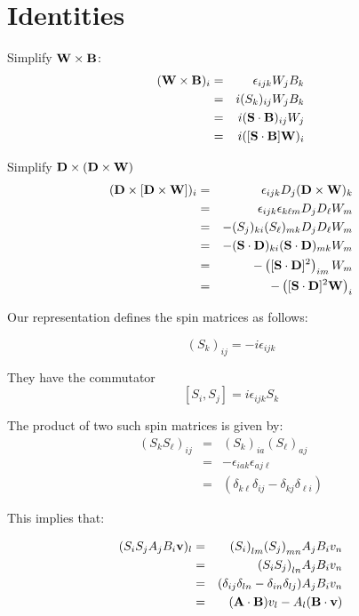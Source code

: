 \section{Identities}

Simplify $ \mathbf{W} \times \mathbf{B}$:
\begin{eqnarray*}
(\mathbf{W} \times \mathbf{B})_i
	&=&	\epsilon_{ijk} W_j B_k	\\
	&=&	i(S_k)_{ij} W_j B_k\\
	&=&	i(\mathbf{S} \cdot \mathbf{B})_{ij} W_j	\\
	&=&	i([\mathbf{S} \cdot \mathbf{B}] \mathbf{W})_i
\end{eqnarray*}

Simplify $\mathbf{D} \times ( \mathbf{D} \times \mathbf{W} ) $
\begin{eqnarray*}
(\mathbf{D} \times [ \mathbf{D} \times \mathbf{W} ] )_i
	&=&	\epsilon_{ijk} D_j (\mathbf{D} \times \mathbf{W})_k	\\
	&=&	\epsilon_{ijk} \epsilon_{k\ell m} D_j D_\ell W_m	\\
	&=&	-(S_j)_{ki} (S_\ell)_{mk} D_j D_\ell W_m	\\
	&=&	-(\mathbf{S} \cdot \mathbf{D})_{ki} (\mathbf{S} \cdot \mathbf{D})_{mk} W_m	\\
	&=&	-\left( [\mathbf{S} \cdot \mathbf{D}]^2 \right)_{im} W_m	\\
	&=&	-\left( [\mathbf{S} \cdot \mathbf{D}]^2 \mathbf{W} \right)_i	\\
\end{eqnarray*}

Our representation defines the spin matrices as follows:

$${(S_k)}_{ij}=-i \epsilon_{ijk}$$

They have the commutator
$$	[S_i, S_j] = i \epsilon_{ijk} S_k $$

The product of two such spin matrices is given by:
\begin{eqnarray*}
{(S_k S_\ell)}_{ij} 
	& = & {(S_k)}_{ia} {(S_\ell)}_{aj} \\
	& = & -\epsilon_{iak} \epsilon_{aj\ell} \\
	& = & (\delta_{k\ell} \delta_{ij} - \delta_{kj} \delta_{\ell i} )
\end{eqnarray*}

This implies that:

\begin{eqnarray*}
(S_i S_j A_j B_i \mathbf{v} )_l 
	&=&  	{(S_i)}_{lm} {(S_j)}_{mn} A_j B_i v_n \\
	&=&	{(S_iS_j)}_{ln} A_j B_i v_n \\
	&=&	 (\delta_{ij} \delta_{ln} - \delta_{in} \delta_{lj} ) A_j B_i v_n \\
	&=&	(\mathbf{A} \cdot \mathbf{B}) v_l  - A_l ( \mathbf{B} \cdot \mathbf{v}) \\
\end{eqnarray*}


